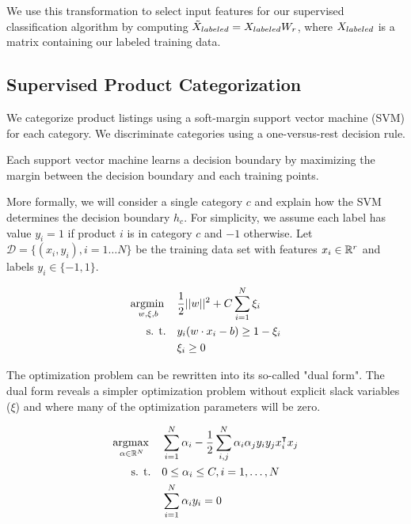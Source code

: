 We use this transformation to select input features for our supervised classification algorithm by
computing $\tilde{X}_{labeled} = X_{labeled} W_r$, where $X_{labeled}$ is a matrix containing our labeled training data. 

\subsection{Supervised Product Categorization}
We categorize product listings using a soft-margin support vector machine (SVM) for each category.
We discriminate categories using a one-versus-rest decision rule.

Each support vector machine learns a decision boundary by maximizing the margin between the decision
boundary and each training points.


More formally, we will consider a single category $c$ and explain how the SVM determines the
decision boundary $h_c$. For simplicity, we assume each label has value $y_i = 1$ if product $i$ is
in category $c$ and $-1$ otherwise. Let $\mathcal{D} = \{(x_i, y_i), i = 1 \ldots N\}$ be the
training data set with features $x_i \in \mathbb{R}^r$ and labels $y_i \in \{-1, 1\}$.

\begin{equation}
\begin{aligned}
  \underset{w,\xi,b}{\argmin} \quad & \frac{1}{2} ||w||^2 + C \sum_{i=1}^{N}{\xi_i} \\
  \text{s. t.} \quad & y_i (w \cdot x_i - b) \ge 1 - \xi_i \\
               \quad & \xi_i \ge 0
\end{aligned}
\end{equation}

The optimization problem can be rewritten into its so-called "dual form". The dual form reveals a
simpler optimization problem without explicit slack variables ($\xi$) and where many of the
optimization parameters will be zero.

\begin{equation}
\begin{aligned}
  \underset{\alpha \in \RR^N}{\argmax} \quad & \sum_{i=1}^{N}{\alpha_i} -
      \frac{1}{2} \sum_{i,j}^{N}{\alpha_i\alpha_j y_i y_j x_i^\intercal x_j} \\
      \text{s. t.} \quad & 0 \le \alpha_i \le C, i = 1, \ldots, N \\
                   \quad & \sum_{i=1}^{N}{\alpha_i y_i} = 0
\end{aligned}
\end{equation}


